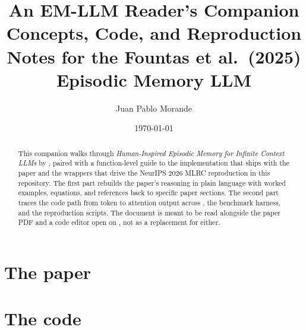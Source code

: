 \documentclass[11pt,a4paper]{article}
\title{An EM-LLM Reader's Companion\\[0.4em]
  \large Concepts, Code, and Reproduction Notes for the Fountas et al.\ (2025) Episodic Memory LLM}
\author{Juan Pablo Morande}
\date{\today}
\begin{document}
\maketitle

\begin{abstract}
\noindent
This companion walks through \emph{Human-Inspired Episodic Memory for Infinite Context LLMs} by \textcite{fountas2025emllm}, paired with a function-level guide to the implementation that ships with the paper and the wrappers that drive the NeurIPS 2026 MLRC reproduction in this repository. The first part rebuilds the paper's reasoning in plain language with worked examples, equations, and references back to specific paper sections. The second part traces the code path from token to attention output across , the benchmark harness, and the reproduction scripts. The document is meant to be read alongside the paper PDF and a code editor open on , not as a replacement for either.
\end{abstract}

\tableofcontents
\newpage



\part{The paper}













\part{The code}









\appendix





\printbibliography
\end{document}
